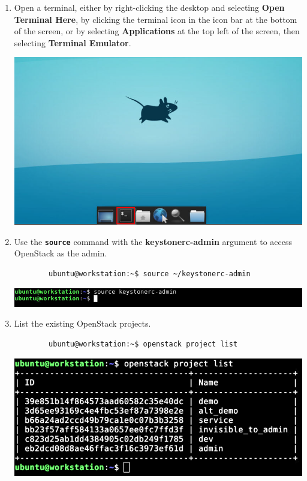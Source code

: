 \documentclass[letterpaper, 12pt]{article}
\begin{document}
\begin{enumerate}    
    \item Open a terminal, either by right-clicking the desktop and selecting \textbf{Open Terminal Here}, by clicking
    the terminal icon in the icon bar at the bottom of the screen, or by selecting \textbf{Applications} at the top
    left of the screen, then selecting \textbf{Terminal Emulator}.

    \begin{center}
        \includegraphics[width=\linewidth]{images/part2/step1.png}
    \end{center}

    \item Use the \textbf{\texttt{source}} command with the \textbf{keystonerc-admin} argument to access OpenStack
    as the admin.
    \begin{lstlisting}
        ubuntu@workstation:~$ source ~/keystonerc-admin
    \end{lstlisting}
    
    \begin{center}
        \includegraphics[width=\linewidth]{images/part2/step2.png}
    \end{center}

    \item List the existing OpenStack projects.
    \begin{lstlisting}
        ubuntu@workstation:~$ openstack project list
    \end{lstlisting}

    \begin{center}
        \includegraphics[width=\linewidth]{images/part2/step3.png}
    \end{center}


\end{enumerate}
\end{document}
